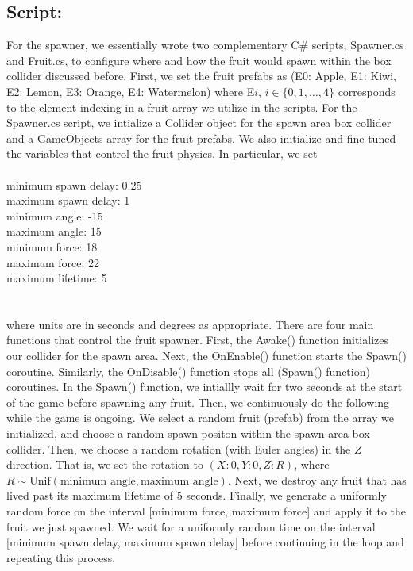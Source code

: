 \subsection{Script:}
For the spawner, we essentially wrote two complementary C# scripts, Spawner.cs and Fruit.cs, to configure where and how the fruit would spawn within the box collider discussed before. First, 
we set the fruit prefabs as (E0: Apple, E1: Kiwi, E2: Lemon, E3: Orange, E4: Watermelon) where E$i$, $i \in \{0, 1, \dots, 4 \}$ corresponds to the element indexing in a fruit array we utilize 
in the scripts. For the Spawner.cs script, we intialize a Collider object for the spawn area box collider and a GameObjects array for the fruit prefabs. We also initialize and fine tuned the 
variables that control the fruit physics. In particular, we set
\\\\
minimum spawn delay: 0.25 \\
maximum spawn delay: 1 \\
minimum angle: -15 \\
maximum angle: 15 \\
minimum force: 18 \\
maximum force: 22 \\
maximum lifetime: 5 \\
\\\\
where units are in seconds and degrees as appropriate. There are four main functions that control the fruit spawner. First, the Awake() function initializes our collider for the spawn area. 
Next, the OnEnable() function starts the Spawn() coroutine. Similarly, the OnDisable() function stops all (Spawn() function) coroutines. In the Spawn() function, we intiallly wait for two seconds 
at the start of the game before spawning any fruit. Then, we continuously do the following while the game is ongoing. We select a random fruit (prefab) from the array we initialized, and choose 
a random spawn positon within the spawn area box collider. Then, we choose a random rotation (with Euler angles) in the $Z$ direction. That is, we set the rotation to $(X: 0, Y: 0, Z: R)$, where 
$R \sim \text{Unif} (\text{minimum angle}, \text{maximum angle})$. Next, we destroy any fruit that has lived past its maximum lifetime of $5$ seconds. Finally, we generate a uniformly random 
force on the interval [minimum force, maximum force] and apply it to the fruit we just spawned. We wait for a uniformly random time on the interval [minimum spawn delay, maximum spawn delay] 
before continuing in the loop and repeating this process.
